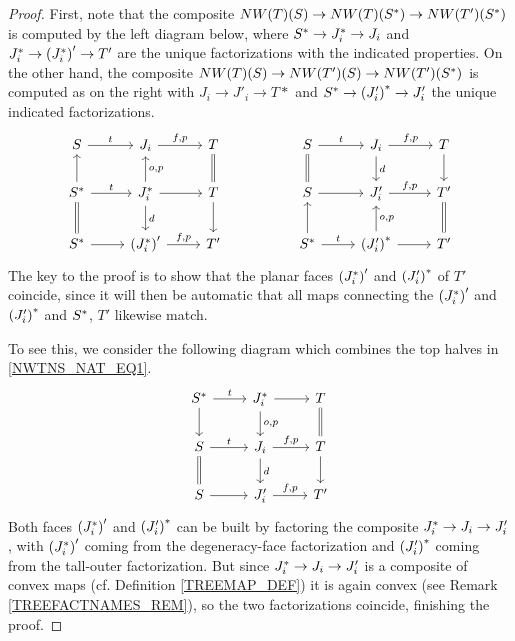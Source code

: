 \documentclass[a4paper,10pt
,draft
]{article}%
\numberwithin{equation}{section}
\numberwithin{figure}{section}
\theoremstyle{definition} %
\newcommand{\1}{\ensuremath{\mathbbm 1}}%
\begin{document}
\begin{proof}
	First, note that the composite
	$NW(T)({S})
	\to 
	NW(T)({S^{\**}})
	\to 
	NW(T')({S^{\**}})$
	is computed by the left diagram below,
	where
	$S^{\**} \to J^{\**}_i \to J_i$
	and 
	$J^{\**}_i \to \left(J_i^{\**}\right)' \to T'$
	are the unique factorizations with the indicated properties.
	On the other hand, the composite
	$NW(T)(S)
	\to 
	NW(T')(S)
	\to 
	NW(T')(S^{\**})$
	is computed as on the right
	with 
	$J_i \to J'_i \to T*$ and
	$S^{\**} \to \left(J_i'\right)^{\**} \to J'_i$
	the unique indicated factorizations.
\begin{equation}\label{NWTNS_NAT_EQ1}
\begin{tikzcd}
	S \ar{r}{t} 
&
	J_i \ar{r}{f,p} 
&
	T \ar[equal]{d}
&&%
	S \ar{r}{t} \ar[equal]{d}
&
	J_i \ar{r}{f,p} \ar{d}{d}
&
	T \ar{d}
\\
	S^{\**} \ar{u} \ar{r}{t} \ar[equal]{d}
&
	J^{\**}_i \ar{r} \arrow{u}[swap]{o,p} \arrow{d}{d}
&
	T \ar{d}
&&%
	S \ar{r}
&
	J'_i \arrow{r}{f,p}
&
	T' \ar[equal]{d}
\\
	S^{\**} \ar{r}
&
	\left(J_i^{\**}\right)' \arrow{r}{f,p}
&
	T'
&&%
	S^{\**} \arrow{r}{t} \ar{u}
&
	\left(J_i'\right)^{\**} \ar{r} \arrow{u}[swap]{o,p}
&
	T'
\end{tikzcd}
\end{equation}
	The key to the proof is to show
	that the planar faces 
	$\left(J_i^{\**}\right)'$ and
	$\left(J_i'\right)^{\**}$
	of $T'$
	coincide, since it will then be automatic that all maps connecting the
	$\left(J_i^{\**}\right)'$ and
	$\left(J_i'\right)^{\**}$
	and $S^{\**}$, $T'$
	likewise match.

	To see this, we consider the following diagram
	which combines the top halves in \eqref{NWTNS_NAT_EQ1}.
\begin{equation}
\begin{tikzcd}
	S^{\**} \ar{r}{t} \ar{d}
&
	J^{\**}_i \ar{r} \ar{d}{o,p}
&
	T \ar[equal]{d}
\\
	S  \ar{r}{t} \ar[equal]{d}
&
	J_i \ar{r}{f,p}  \ar{d}{d}
&
	T \ar{d}
\\
	S \ar{r}
&
	J_i' \ar{r}{f,p}
&
	T'
\end{tikzcd}
\end{equation}
	Both faces  
	$\left(J^{\**}_i\right)'$ and 
	$\left(J'_i\right)^{\**}
	$
	can be built by factoring
	the composite 
	$J^{\**}_i \to J_i \to J_i'$,
	with 
	$\left(J^{\**}_i\right)'$ 
	coming from the 
	degeneracy-face factorization
	and 
	$\left(J'_i\right)^{\**}$
	coming from the 
	tall-outer factorization.
	But since 
	$J^{\**}_i \to J_i \to J_i'$
	is a composite of convex maps (cf. Definition \ref{TREEMAP_DEF})
    it is again convex (see Remark \ref{TREEFACTNAMES_REM}), 
	so the two factorizations coincide, 
	finishing the proof.
\end{proof}
\end{document}

